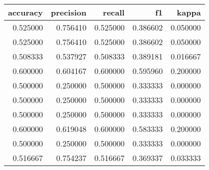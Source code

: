 \begin{tabular}{rrrrr}
\toprule
accuracy & precision & recall & f1 & kappa \\
\midrule
0.525000 & 0.756410 & 0.525000 & 0.386602 & 0.050000 \\
0.525000 & 0.756410 & 0.525000 & 0.386602 & 0.050000 \\
0.508333 & 0.537927 & 0.508333 & 0.389181 & 0.016667 \\
0.600000 & 0.604167 & 0.600000 & 0.595960 & 0.200000 \\
0.500000 & 0.250000 & 0.500000 & 0.333333 & 0.000000 \\
0.500000 & 0.250000 & 0.500000 & 0.333333 & 0.000000 \\
0.500000 & 0.250000 & 0.500000 & 0.333333 & 0.000000 \\
0.600000 & 0.619048 & 0.600000 & 0.583333 & 0.200000 \\
0.500000 & 0.250000 & 0.500000 & 0.333333 & 0.000000 \\
0.516667 & 0.754237 & 0.516667 & 0.369337 & 0.033333 \\
\bottomrule
\end{tabular}
